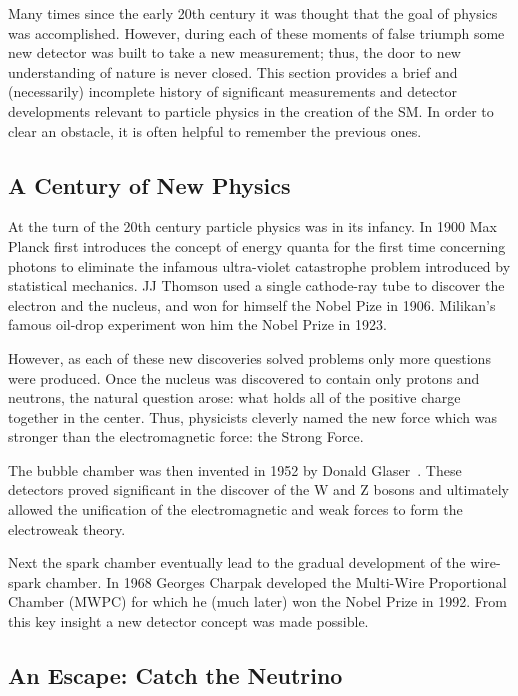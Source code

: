 Many times since the early 20th century it was thought that the goal of physics was accomplished.
However, during each of these moments of false triumph some new detector was built to take a new measurement; thus, the door to new understanding of nature is never closed.
This section provides a brief and (necessarily) incomplete history of significant measurements and detector developments relevant to particle physics in the creation of the SM.
In order to clear an obstacle, it is often helpful to remember the previous ones.


\subsection{A Century of New Physics}

At the turn of the 20th century particle physics was in its infancy.
In 1900 Max Planck first introduces the concept of energy quanta for the first time concerning photons to eliminate the infamous ultra-violet catastrophe problem introduced by statistical mechanics.
JJ Thomson used a single cathode-ray tube to discover the electron and the nucleus, and won for himself the Nobel Pize in 1906.
Milikan's famous oil-drop experiment won him the Nobel Prize in 1923.

However, as each of these new discoveries solved problems only more questions were produced.
Once the nucleus was discovered to contain only protons and neutrons, the natural question arose: what holds all of the positive charge together in the center.
Thus, physicists cleverly named the new force which was stronger than the electromagnetic force: the Strong Force.

The bubble chamber was then invented in 1952 by Donald Glaser~\citep{bubbleChamber_PhysRev.87.665}.
These detectors proved significant in the discover of the W and Z bosons and ultimately allowed the unification of the electromagnetic and weak forces to form the electroweak theory.

Next the spark chamber eventually lead to the gradual development of the wire-spark chamber.
In 1968 Georges Charpak developed the Multi-Wire Proportional Chamber (MWPC) for which he (much later) won the Nobel Prize in 1992.
From this key insight a new detector concept was made possible.


\subsection{An Escape: Catch the Neutrino}

